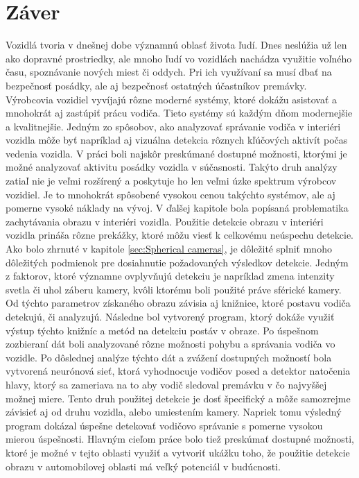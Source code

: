 \documentclass[slovak,master,dept460,male,cpp,cpdeclaration]{diploma}
\begin{document}
\section{Záver}
\label{sec:Zaver}
Vozidlá tvoria v dnešnej dobe  významnú oblasť života ľudí. Dnes neslúžia už len ako dopravné prostriedky, ale mnoho ľudí vo vozidlách nachádza využitie voľného času, spoznávanie nových miest či oddych. Pri ich využívaní sa musí dbať na bezpečnosť posádky, ale aj bezpečnosť ostatných účastníkov premávky. Výrobcovia vozidiel vyvíjajú rôzne moderné systémy, ktoré dokážu asistovať a mnohokrát aj zastúpiť prácu vodiča. Tieto systémy sú každým dňom modernejšie a kvalitnejšie. Jedným zo spôsobov, ako analyzovať správanie vodiča v interiéri vozidla môže byť napríklad aj vizuálna detekcia rôznych kľúčových aktivít počas vedenia vozidla. V práci boli najskôr preskúmané dostupné možnosti, ktorými je možné analyzovať aktivitu posádky vozidla v súčasnosti. Takýto druh analýzy zatiaľ nie je veľmi rozšírený a poskytuje ho len veľmi úzke spektrum výrobcov vozidiel. Je to mnohokrát spôsobené vysokou cenou takýchto systémov, ale aj pomerne vysoké náklady na vývoj. V ďalšej kapitole bola  popísaná  problematika zachytávania obrazu v interiéri vozidla. Použitie detekcie obrazu v interiéri vozidla prináša rôzne prekážky, ktoré môžu viesť k celkovému neúspechu detekcie. Ako bolo zhrnuté v kapitole \ref{sec:Spherical cameras}, je dôležité splniť mnoho dôležitých podmienok pre dosiahnutie požadovaných výsledkov detekcie. Jedným z faktorov, ktoré významne ovplyvňujú detekciu je napríklad zmena intenzity svetla či uhol záberu kamery, kvôli ktorému boli použité práve sférické kamery. Od týchto parametrov získaného obrazu závisia aj knižnice, ktoré postavu vodiča detekujú, či analyzujú. Následne bol vytvorený program, ktorý dokáže využiť výstup týchto knižníc a metód na detekciu postáv v obraze. Po úspešnom zozbieraní dát boli analyzované  rôzne možnosti pohybu a správania vodiča vo vozidle. Po dôslednej analýze týchto dát a zvážení dostupných možností bola vytvorená neurónová sieť, ktorá vyhodnocuje vodičov posed a detektor natočenia hlavy, ktorý sa zameriava na to aby vodič sledoval premávku  v čo najvyššej možnej miere. Tento druh použitej detekcie je dosť špecifický  a môže samozrejme závisieť aj od druhu vozidla, alebo umiestením kamery. Napriek tomu výsledný program dokázal úspešne detekovať vodičovo správanie s pomerne vysokou mierou úspešnosti. Hlavným cieľom práce bolo tiež preskúmať dostupné možnosti, ktoré je možné v tejto oblasti využiť a vytvoriť ukážku toho, že použitie detekcie obrazu v automobilovej oblasti má veľký potenciál v budúcnosti. 




\end{document}
